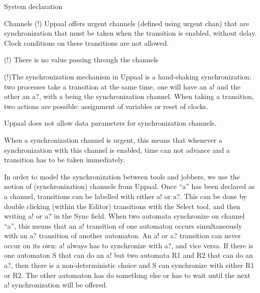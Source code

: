 \documentclass{beamer}
\begin{document}
\begin{frame}{System declaration}
	
\end{frame}

\begin{frame}{Channels}
	(!)  Uppaal offers urgent channels (defined using urgent chan) that are synchronization that must be taken when the transition is enabled, without delay. Clock conditions on these transitions are not allowed.
	
	(!) There is no value passing through the channels
	
	(!)The synchronization mechanism in Uppaal is a hand-shaking synchronization: two processes take a transition at the same time, one will have an a! and the other an a?, with a being the synchronization channel. When taking a transition, two actions are possible: assignment of variables or reset of clocks. 
	
	Uppaal does not allow
	data parameters for synchronization channels.
	
	When a synchronization channel is urgent, this means that whenever a synchronization with this channel is enabled, time can not advance and a transition has to be taken immediately.\newline
	
	In order to model the synchronization between tools and jobbers,
	we use the notion of (synchronization) channels from Uppaal. Once “a” has been
	declared as a channel, transitions can be labelled with either a! or a?. This can be
	done by double clicking (within the Editor) transitions with the Select tool, and then
	writing a! or a? in the Sync field. When two automata synchronize on channel “a”,
	this means that an a! transition of one automaton occurs simultaneously with an
	a? transition of another automaton. An a! or a? transition can never occur on its
	own: a! always has to synchronize with a?, and vice versa. If there is one automaton
	S that can do an a! but two automata R1 and R2 that can do an a?, then there is
	a non-deterministic choice and S can synchronize with either R1 or R2. The other
	automaton has do something else or has to wait until the next a! synchronization
	will be offered.
\end{frame}
\end{document}
